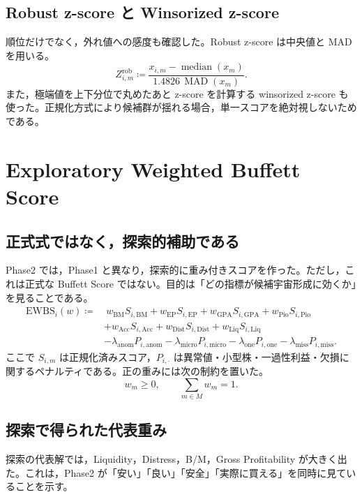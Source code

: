 \documentclass[a4paper,10pt]{article}
\newcommand{\metric}[1]{\mathrm{#1}}
\newcommand{\median}{\operatorname{median}}
\newcommand{\MAD}{\operatorname{MAD}}
\begin{document}
\subsection{Robust z-score と Winsorized z-score}
順位だけでなく，外れ値への感度も確認した。Robust z-score は中央値と MAD を用いる。
\begin{equation}
Z^{\mathrm{rob}}_{i,m} \coloneqq \frac{x_{i,m}-\median(x_m)}{1.4826\,\MAD(x_m)} .
\end{equation}
また，極端値を上下分位で丸めたあと z-score を計算する winsorized z-score も使った。正規化方式により候補群が揺れる場合，単一スコアを絶対視しないためである。

\section{Exploratory Weighted Buffett Score}

\subsection{正式式ではなく，探索的補助である}
Phase2 では，Phase1 と異なり，探索的に重み付きスコアを作った。ただし，これは正式な Buffett Score ではない。目的は「どの指標が候補宇宙形成に効くか」を見ることである。
\begin{align}
\metric{EWBS}_i(w) \coloneqq &\ w_{\mathrm{BM}}S_{i,\mathrm{BM}} + w_{\mathrm{EP}}S_{i,\mathrm{EP}} + w_{\mathrm{GPA}}S_{i,\mathrm{GPA}} + w_{\mathrm{Pio}}S_{i,\mathrm{Pio}} \\
&+ w_{\mathrm{Acc}}S_{i,\mathrm{Acc}} + w_{\mathrm{Dist}}S_{i,\mathrm{Dist}} + w_{\mathrm{Liq}}S_{i,\mathrm{Liq}} \\
&- \lambda_{\mathrm{anom}}P_{i,\mathrm{anom}} - \lambda_{\mathrm{micro}}P_{i,\mathrm{micro}} - \lambda_{\mathrm{one}}P_{i,\mathrm{one}} - \lambda_{\mathrm{miss}}P_{i,\mathrm{miss}} .
\end{align}
ここで $S_{i,m}$ は正規化済みスコア，$P_{i,\cdot}$ は異常値・小型株・一過性利益・欠損に関するペナルティである。正の重みには次の制約を置いた。
\begin{equation}
 w_m \ge 0, \qquad \sum_{m\in M} w_m = 1 .
\end{equation}

\subsection{探索で得られた代表重み}
探索の代表解では，Liquidity，Distress，B/M，Gross Profitability が大きく出た。これは，Phase2 が「安い」「良い」「安全」「実際に買える」を同時に見ていることを示す。
\end{document}
